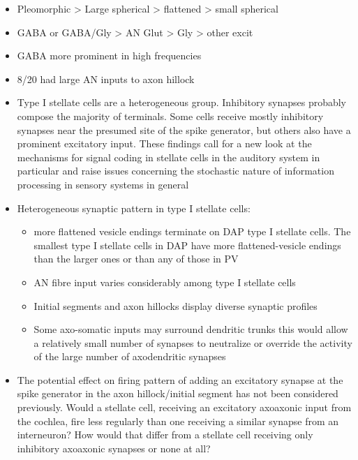 \documentclass[10pt,a4paper]{article}
\begin{document}
\begin{itemize}
\item Pleomorphic {\textgreater} Large spherical {\textgreater} flattened
  {\textgreater} small spherical
\item GABA or GABA/Gly {\textgreater} AN Glut {\textgreater} Gly {\textgreater}
  other excit
\item GABA more prominent in high frequencies
\item 8/20 had large AN inputs to axon hillock
\item Type I stellate cells are a heterogeneous group. Inhibitory synapses
  probably compose the majority of terminals. Some cells receive mostly
  inhibitory synapses near the presumed site of the spike generator, but others
  also have a prominent excitatory input. These findings call for a new look at
  the mechanisms for signal coding in stellate cells in the auditory system in
  particular and raise issues concerning the stochastic nature of information
  processing in sensory systems in general
\item Heterogeneous synaptic pattern in type I stellate cells:

  \begin{itemize}
  \item more flattened vesicle endings terminate on DAP type I stellate
    cells. The smallest type I stellate cells in DAP have more flattened-vesicle
    endings than the larger ones or than any of those in PV
  \item AN fibre input varies considerably among type I stellate cells
  \item Initial segments and axon hillocks display diverse synaptic profiles
  \item Some axo-somatic inputs may surround dendritic trunks this would allow a
    relatively small number of synapses to neutralize or override the activity
    of the large number of axodendritic synapses
  \end{itemize}
\item The potential effect on firing pattern of adding an excitatory synapse at
  the spike generator in the axon hillock/initial segment has not been
  considered previously. Would a stellate cell, receiving an excitatory
  axoaxonic input from the cochlea, fire less regularly than one receiving a
  similar synapse from an interneuron? How would that differ from a stellate
  cell receiving only inhibitory axoaxonic synapses or none at all?
\end{itemize}
\end{document}
